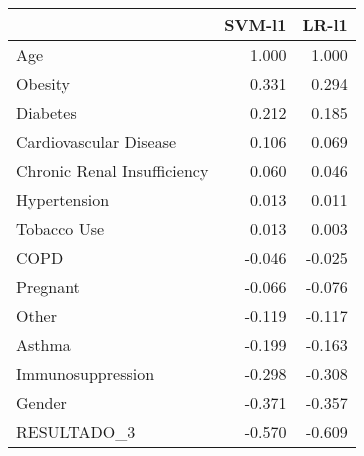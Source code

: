 \begin{tabular}{lrr}
\toprule
{} &  SVM-l1 &  LR-l1 \\
\midrule
Age                         &   1.000 &  1.000 \\
Obesity                     &   0.331 &  0.294 \\
Diabetes                    &   0.212 &  0.185 \\
Cardiovascular Disease      &   0.106 &  0.069 \\
Chronic Renal Insufficiency &   0.060 &  0.046 \\
Hypertension                &   0.013 &  0.011 \\
Tobacco Use                 &   0.013 &  0.003 \\
COPD                        &  -0.046 & -0.025 \\
Pregnant                    &  -0.066 & -0.076 \\
Other                       &  -0.119 & -0.117 \\
Asthma                      &  -0.199 & -0.163 \\
Immunosuppression           &  -0.298 & -0.308 \\
Gender                      &  -0.371 & -0.357 \\
RESULTADO\_3                 &  -0.570 & -0.609 \\
\bottomrule
\end{tabular}
